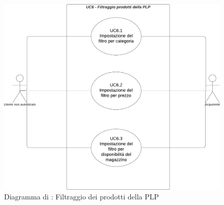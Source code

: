 \begin{figure}[H]
    \centering
    \includegraphics[scale=0.5]{Immagini/DiagrammiUC/UC6FiltraggioProdottiDellaPLP.png}
    \caption{Diagramma di \actualUC: Filtraggio dei prodotti della PLP} 
\end{figure}

